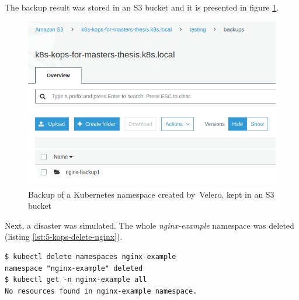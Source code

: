 The backup result was stored in an S3 bucket and it is presented in figure \ref{fig:kops-velero-backup}.
\begin{figure}[H]
    \centering
    \includegraphics[width=13cm]{figures/kops-velero-backup.png}
    \captionsetup{justification=centering,margin=2cm}
    \caption{Backup of a Kubernetes namespace created by~Velero, kept in an S3 bucket}
    \label{fig:kops-velero-backup}
\end{figure}

Next, a disaster was simulated. The whole \textit{nginx-example} namespace was deleted (listing \ref{lst:5-kops-delete-nginx}).
\begin{lstlisting}[basicstyle=\scriptsize,xleftmargin=0cm,label=lst:5-kops-delete-nginx,caption={Simulating a disaster to test backup}]
$ kubectl delete namespaces nginx-example
namespace "nginx-example" deleted
$ kubectl get -n nginx-example all
No resources found in nginx-example namespace.
\end{lstlisting}

